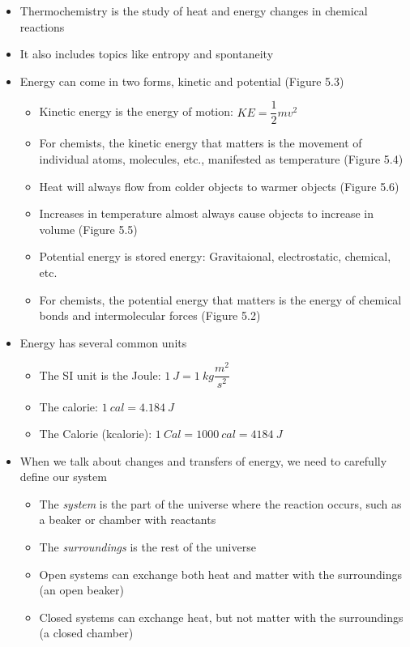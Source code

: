 \documentclass[12pt, openany, letterpaper]{memoir}
\begin{document}
\begin{itemize}
	\item Thermochemistry is the study of heat and energy changes in chemical reactions
	\item It also includes topics like entropy and spontaneity
	\item Energy can come in two forms, kinetic and potential (Figure 5.3)
    \begin{itemize}
      \item Kinetic energy is the energy of motion: $KE=\dfrac{1}{2}mv^2$
      \item For chemists, the kinetic energy that matters is the movement of individual atoms, molecules, etc., manifested as temperature (Figure 5.4)
      \item Heat will always flow from colder objects to warmer objects (Figure 5.6)
      \item Increases in temperature almost always cause objects to increase in volume (Figure 5.5)
      \item Potential energy is stored energy: Gravitaional, electrostatic, chemical, etc.
      \item For chemists, the potential energy that matters is the energy of chemical bonds and intermolecular forces (Figure 5.2)
    \end{itemize}
	\item Energy has several common units
    \begin{itemize}
      \item The SI unit is the Joule: $1~J=1~kg\dfrac{m^2}{s^2}$
      \item The calorie: $1~cal=4.184~J$
      \item The Calorie (kcalorie): $1~Cal=1000~cal=4184~J$
    \end{itemize}
  \item When we talk about changes and transfers of energy, we need to carefully define our system
    \begin{itemize}
      \item The \emph{system} is the part of the universe where the reaction occurs, such as a beaker or chamber with reactants
      \item The \emph{surroundings} is the rest of the universe
      \item Open systems can exchange both heat and matter with the surroundings (an open beaker)
      \item Closed systems can exchange heat, but not matter with the surroundings (a closed chamber)

\end{itemize}
\end{itemize}
\end{document}
